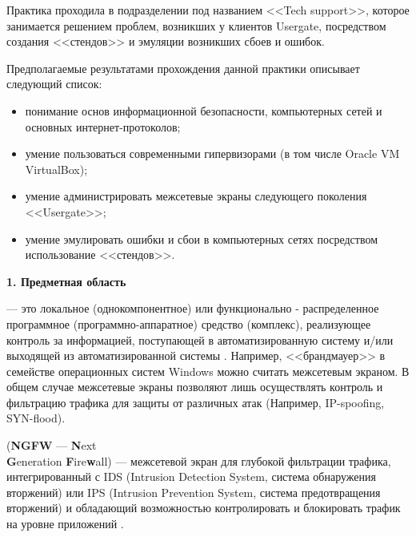 Практика проходила в подразделении под названием <<Tech support>>, которое занимается решением проблем, возникших у клиентов Usergate, посредством создания <<стендов>> и эмуляции возникших сбоев и ошибок.
		
Предполагаемые результатами прохождения данной практики описывает следующий список:

\begin{itemize}[nosep]
	\item понимание основ информационной безопасности, компьютерных сетей и основных интернет-протоколов;
				
	\item умение пользоваться современными гипервизорами (в том числе Oracle VM VirtualBox);
			
	\item умение администрировать межсетевые экраны следующего поколения\\<<Usergate>>;
			
	\item умение эмулировать ошибки и сбои в компьютерных сетях посредством использование <<стендов>>.
\end{itemize}

\newpage

\begin{center}
	\textbf{\Large 1. Предметная область}
\end{center}

 --- это локальное (однокомпонентное) или функционально - распределенное программное (программно-аппаратное) средство (комплекс), реализующее контроль за информацией, поступающей в автоматизированную систему и/или выходящей из автоматизированной системы \cite{fw}. Например, <<брандмауер>> в семействе операционных систем Windows можно считать межсетевым экраном. В общем случае межсетевые экраны позволяют лишь осуществлять контроль и фильтрацию трафика для защиты от различных атак (Например, IP-spoofing, SYN-flood).
		
 (\textbf{NGFW} --- \textbf{N}ext \\\textbf{G}eneration \textbf{F}ire\textbf{w}all) --- межсетевой экран для глубокой фильтрации трафика, интегрированный с IDS (Intrusion Detection System, система обнаружения вторжений) или IPS (Intrusion Prevention System, система предотвращения вторжений) и обладающий возможностью контролировать и блокировать трафик на уровне приложений \cite{ngfw1}.

